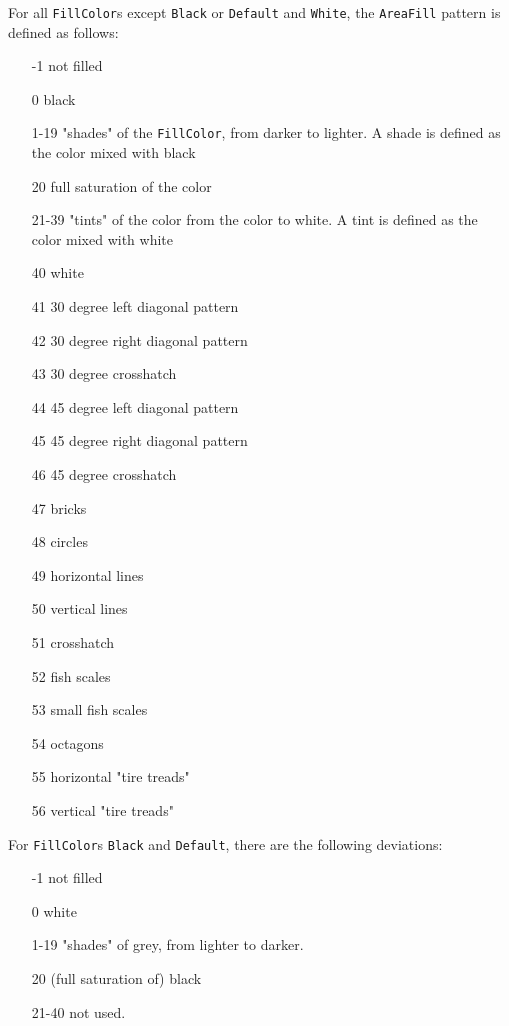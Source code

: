 \documentclass[10pt, a4paper]{article}
\begin{document}
For all {\tt FillColor}s except {\tt Black} or {\tt Default} and {\tt White}, 
the {\tt AreaFill} pattern is defined as follows: 
%
\begin{enumerate}
\item[-1]    not filled
\item[0]     black
\item[1-19]  "shades" of the {\tt FillColor}, from darker to lighter.
             A shade is defined as the color mixed with black
\item[20]    full saturation of the color
\item[21-39] "tints" of the color from the color to white.
             A tint is defined as the color mixed with white
\item[40]    white
\item[41]    30 degree left diagonal pattern
\item[42]    30 degree right diagonal pattern
\item[43]    30 degree crosshatch
\item[44]    45 degree left diagonal pattern
\item[45]    45 degree right diagonal pattern
\item[46]    45 degree crosshatch
\item[47]    bricks
\item[48]    circles
\item[49]    horizontal lines
\item[50]    vertical lines
\item[51]    crosshatch
\item[52]    fish scales
\item[53]    small fish scales
\item[54]    octagons
\item[55]    horizontal "tire treads"
\item[56]    vertical "tire treads"
\end{enumerate}

For {\tt FillColor}s {\tt Black} and {\tt Default}, 
there are the following deviations: 
%
\begin{enumerate}
\item[-1]    not filled
\item[0]     white
\item[1-19]  "shades" of grey, from lighter to darker.
\item[20]    (full saturation of) black
\item[21-40] not used. 
\end{enumerate}
\end{document}
